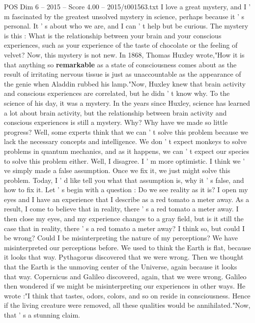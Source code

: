\begin{textsample}{POS Dim 6 – 2015 – Score 4.00 – 2015/t001563.txt}  \label{ex:f6_pos_051}
I love a great mystery, and I ' m fascinated by the greatest unsolved mystery in science, perhaps because it ' s personal.
It ' s about who we are, and I can ' t help but be curious.
The mystery is this : What is the relationship between your brain and your conscious experiences, such as your experience of the taste of chocolate or the feeling of velvet?
Now, this mystery is not new.
In 1868, Thomas Huxley wrote,"How it is that anything so \textbf{remarkable} as a state of consciousness comes about as the result of irritating nervous tissue is just as unaccountable as the appearance of the genie when Aladdin rubbed his lamp."Now, Huxley knew that brain activity and conscious experiences are correlated, but he didn ' t know why.
To the science of his day, it was a mystery.
In the years since Huxley, science has learned a lot about brain activity, but the relationship between brain activity and conscious experiences is still a mystery.
Why?
Why have we made so little progress?
Well, some experts think that we can ' t solve this problem because we lack the necessary concepts and intelligence.
We don ' t expect monkeys to solve problems in quantum mechanics, and as it happens, we can ' t expect our species to solve this problem either.
Well, I disagree.
I ' m more optimistic.
I think we ' ve simply made a false assumption.
Once we fix it, we just might solve this problem.
Today, I ' d like tell you what that assumption is, why it ' s false, and how to fix it.
Let ' s begin with a question : Do we see reality as it is?
I open my eyes and I have an experience that I describe as a red tomato a meter away.
As a result, I come to believe that in reality, there ' s a red tomato a meter away.
I then close my eyes, and my experience changes to a gray field, but is it still the case that in reality, there ' s a red tomato a meter away?
I think so, but could I be wrong?
Could I be misinterpreting the nature of my perceptions?
We have misinterpreted our perceptions before.
We used to think the Earth is flat, because it looks that way.
Pythagorus discovered that we were wrong.
Then we thought that the Earth is the unmoving center of the Universe, again because it looks that way.
Copernicus and Galileo discovered, again, that we were wrong.
Galileo then wondered if we might be misinterpreting our experiences in other ways.
He wrote :"I think that tastes, odors, colors, and so on reside in consciousness.
Hence if the living creature were removed, all these qualities would be annihilated."Now, that ' s a stunning claim.

\end{textsample}
